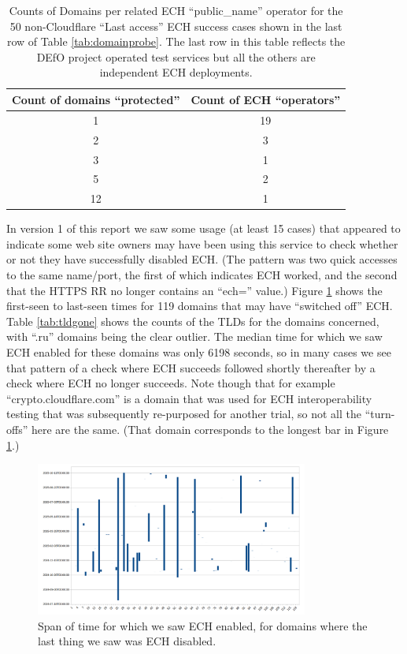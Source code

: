 \begin{table} 
	\centering
        \caption{Counts of Domains per related ECH ``public\_name'' operator for
                 the 50 non-Cloudflare ``Last access'' ECH success cases shown
                 in the last row of Table \ref{tab:domainprobe}. The last row
                 in this table reflects the DEfO project operated test services but
                 all the others are independent ECH deployments.}
		\begin{tabular} { | c | c | }
		\hline
            \hline Count of domains ``protected'' & Count of ECH ``operators'' \\
		\hline
            \hline 1 & 19 \\
            \hline 2 & 3 \\
            \hline 3 & 1 \\
            \hline 5 & 2 \\
            \hline 12 & 1 \\
		\hline
		\end{tabular}
	\label{tab:notcf}
\end{table}

In version 1 of this report we saw some usage (at least 15 cases) that
appeared to indicate some web site owners may have been using this service to check
whether or not they have successfully disabled ECH. (The pattern was two quick
accesses to the same name/port, the first of which indicates ECH worked, and
the second that the HTTPS RR no longer contains an ``ech='' value.)
Figure \ref{fig:onoff} shows the first-seen to last-seen times for 119
domains that may have ``switched off'' ECH. Table \ref{tab:tldgone} shows the
counts of the TLDs for the domains concerned, with ``.ru'' domains being
the clear outlier. The median time for which we saw ECH enabled for these
domains was only 6198 seconds, so in many cases we see that pattern of a
check where ECH succeeds followed shortly thereafter by a check
where ECH no longer succeeds. Note though that for example ``crypto.cloudflare.com''
is a domain that was used for ECH interoperability testing that was subsequently 
re-purposed for another trial, so not all the ``turn-offs'' here are
the same. (That domain corresponds to the longest bar in Figure \ref{fig:onoff}.)

\begin{figure}
	\centering
	\includegraphics[width=0.8\textwidth,keepaspectratio]{turnofftimes.png}
        \caption[clustediag]{Span of time for which we saw ECH enabled, for
        domains where the last thing we saw was ECH disabled.}
	\label{fig:onoff}
\end{figure}

